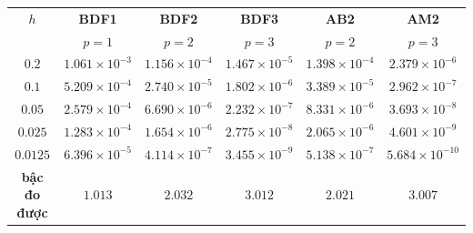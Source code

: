 \renewcommand{\arraystretch}{1.2}
\begin{tabular}{cccccc}
\toprule
$h$ & \textbf{BDF1} & \textbf{BDF2} & \textbf{BDF3} & \textbf{AB2} & \textbf{AM2}\\
 & $p=1$ & $p=2$ & $p=3$ & $p=2$ & $p=3$\\
\midrule
$0.2$ & $1.061\times 10^{-3}$ & $1.156\times 10^{-4}$ & $1.467\times 10^{-5}$ & $1.398\times 10^{-4}$ & $2.379\times 10^{-6}$\\
$0.1$ & $5.209\times 10^{-4}$ & $2.740\times 10^{-5}$ & $1.802\times 10^{-6}$ & $3.389\times 10^{-5}$ & $2.962\times 10^{-7}$\\
$0.05$ & $2.579\times 10^{-4}$ & $6.690\times 10^{-6}$ & $2.232\times 10^{-7}$ & $8.331\times 10^{-6}$ & $3.693\times 10^{-8}$\\
$0.025$ & $1.283\times 10^{-4}$ & $1.654\times 10^{-6}$ & $2.775\times 10^{-8}$ & $2.065\times 10^{-6}$ & $4.601\times 10^{-9}$\\
$0.0125$ & $6.396\times 10^{-5}$ & $4.114\times 10^{-7}$ & $3.455\times 10^{-9}$ & $5.138\times 10^{-7}$ & $5.684\times 10^{-10}$\\
\midrule
\textbf{bậc đo được} & $1.013$ & $2.032$ & $3.012$ & $2.021$ & $3.007$\\
\bottomrule
\end{tabular}
